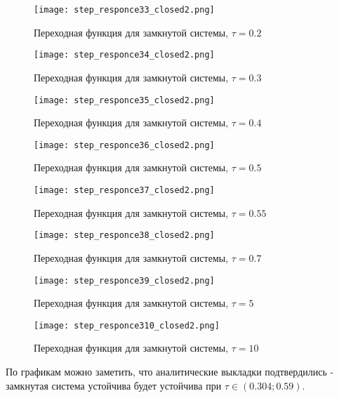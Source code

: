 \newpage
\begin{figure}[ht]
    \centering
    \texttt{[image: step\_responce33\_closed2.png]}
    \caption{Переходная функция для замкнутой системы, $\tau=0.2$}
\end{figure}
\begin{figure}[ht]
    \centering
    \texttt{[image: step\_responce34\_closed2.png]}
    \caption{Переходная функция для замкнутой системы, $\tau=0.3$}
\end{figure}

\newpage
\begin{figure}[ht]
    \centering
    \texttt{[image: step\_responce35\_closed2.png]}
    \caption{Переходная функция для замкнутой системы, $\tau=0.4$}
\end{figure}
\begin{figure}[ht]
    \centering
    \texttt{[image: step\_responce36\_closed2.png]}
    \caption{Переходная функция для замкнутой системы, $\tau=0.5$}
\end{figure}

\newpage
\begin{figure}[ht]
    \centering
    \texttt{[image: step\_responce37\_closed2.png]}
    \caption{Переходная функция для замкнутой системы, $\tau=0.55$}
\end{figure}
\begin{figure}[ht]
    \centering
    \texttt{[image: step\_responce38\_closed2.png]}
    \caption{Переходная функция для замкнутой системы, $\tau=0.7$}
\end{figure}

\newpage
\begin{figure}[ht]
    \centering
    \texttt{[image: step\_responce39\_closed2.png]}
    \caption{Переходная функция для замкнутой системы, $\tau=5$}
\end{figure}
\begin{figure}[ht]
    \centering
    \texttt{[image: step\_responce310\_closed2.png]}
    \caption{Переходная функция для замкнутой системы, $\tau=10$}
\end{figure}

По графикам можно заметить, что аналитические выкладки подтвердились - замкнутая система устойчива будет устойчива при $\tau \in (0.304; 0.59)$.

\endinput